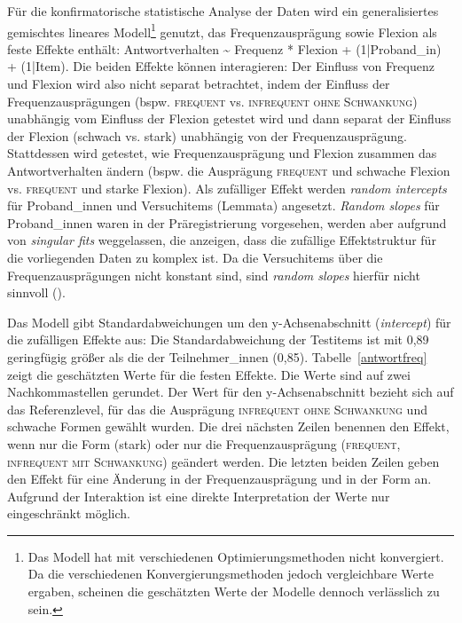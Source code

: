 Für die konfirmatorische statistische Analyse der Daten wird ein generalisiertes gemischtes lineares Modell{\footnote{Das Modell hat mit verschiedenen Optimierungsmethoden nicht konvergiert. Da die verschiedenen Konvergierungsmethoden jedoch vergleichbare Werte ergaben, scheinen die geschätzten Werte der Modelle dennoch verlässlich zu sein.}} genutzt, das Frequenzausprägung sowie Flexion als feste Effekte enthält: Antwortverhalten \~{} Frequenz * Flexion + (1|Proband\_in) + (1|Item). Die beiden Effekte können interagieren: Der Einfluss von Frequenz und Flexion wird also nicht separat betrachtet, indem der Einfluss der Frequenzausprägungen (bspw. \textsc{frequent} vs. \textsc{infrequent ohne Schwankung}) unabhängig vom Einfluss der Flexion getestet wird und dann separat der Einfluss der Flexion (schwach vs. stark) unabhängig von der Frequenzausprägung. Stattdessen wird getestet, wie Frequenzausprägung und Flexion zusammen das Antwortverhalten ändern (bspw. die Ausprägung \textsc{frequent} und schwache Flexion vs. \textsc{frequent} und starke Flexion). Als zufälliger Effekt werden \textit{random intercepts} für Pro\-\mbox{band\_in}\-nen und Versuchitems (Lemmata) angesetzt. \textit{Random slopes} für Proband\_innen waren in der Präregistrierung vorgesehen, werden aber aufgrund von \textit{singular fits} weggelassen, die anzeigen, dass die zufällige Effektstruktur für die vorliegenden Daten zu komplex ist. Da die Versuch\-items über die Frequenzausprägungen nicht konstant sind, sind \textit{random slopes} hierfür nicht sinnvoll (\cite[243]{Winter.2020}).\largerpage

 
Das Modell gibt Standardabweichungen um den y-Achsenabschnitt (\textit{intercept}) für die zufälligen Effekte aus: Die Standardabweichung der Testitems ist mit 0,89 geringfügig größer als die der Teilnehmer\_innen (0,85). Tabelle~\ref{antwortfreq} zeigt die geschätzten Werte für die festen Effekte. Die Werte sind auf zwei Nachkomma\-stellen gerundet. Der Wert für den y-Achsenabschnitt bezieht sich auf das Referenzlevel, für das die Ausprägung \textsc{infrequent ohne Schwankung} und schwache Formen gewählt wurden. Die drei nächsten Zeilen benennen den Effekt, wenn nur die Form (stark) oder nur die Frequenzausprägung (\textsc{frequent}, \textsc{infrequent mit Schwankung}) geändert werden. Die letzten beiden Zeilen geben den Effekt für eine Änderung in der Frequenzausprägung und in der Form an. Aufgrund der Interaktion ist eine direkte Interpretation der Werte nur eingeschränkt möglich.

